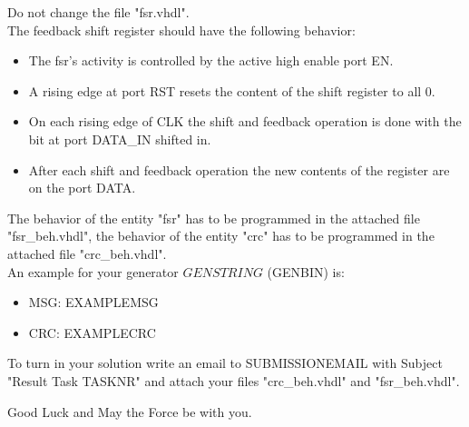 \documentclass[a4paper,12pt]{article}
\begin{document}
Do not change the file "fsr.vhdl".
\\

The feedback shift register should have the following behavior:
\begin{itemize}
    \item The fsr's activity is controlled by the active high enable port EN.
    \item A rising edge at port RST resets the content of the shift register to all 0.
    \item On each rising edge of CLK the shift and feedback operation is done with the bit at port DATA\_IN shifted in.
    \item After each shift and feedback operation the new contents of the register are on the port DATA.
\end{itemize}
The behavior of the entity "fsr" has to be programmed in the attached file "fsr\_beh.vhdl", the behavior of the entity "crc" has to be programmed in the attached file "crc\_beh.vhdl".
\\



An example for your generator ${{GENSTRING}}$ ({{GENBIN}}) is:
\begin{itemize}
    \item MSG: {{EXAMPLEMSG}}
    \item CRC: {{EXAMPLECRC}}
\end{itemize}

\vspace{0.3cm}
To turn in your solution write an email to {{SUBMISSIONEMAIL}} with Subject "Result Task {{TASKNR}}" and attach your files "crc\_beh.vhdl" and "fsr\_beh.vhdl".
\vspace{0.7cm}

Good Luck and May the Force be with you.
\end{document}
